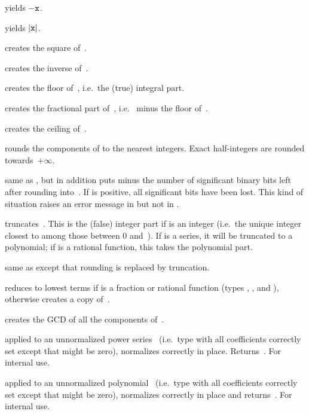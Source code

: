 
 yields $-{\tt x}$.

 yields $|{\tt x}|$.

 creates the square of~.

 creates the inverse of~.

 creates the floor of~, i.e.\ the (true)
integral part.

 creates the fractional part of~, i.e.\ 
minus the floor of~.

 creates the ceiling of~.

 rounds the components of  to the nearest
integers. Exact half-integers are rounded towards~$+\infty$.

 same as , but in addition puts
minus the number of significant binary bits left after rounding into~.
If  is positive, all significant bits have been lost. This kind of
situation raises an error message in  but not in .

 truncates~. This is the (false) integer part
if  is an integer (i.e.~the unique integer closest to  among
those between 0 and~). If  is a series, it will be truncated
to a polynomial; if  is a rational function, this takes the
polynomial part.

 same as  except that
rounding is replaced by truncation.

 reduces  to lowest terms if 
is a fraction or rational function (types , ,
 and ), otherwise creates a copy of~.

 creates the GCD of all the components of~.

 applied to an unnormalized power series~
(i.e.~type  with all coefficients correctly set except that 
might be zero), normalizes  correctly in place. Returns~.
For internal use.

 applied to an unnormalized polynomial~
(i.e.~type  with all coefficients correctly set except that 
might be zero), normalizes  correctly in place and returns~.
For internal use.

